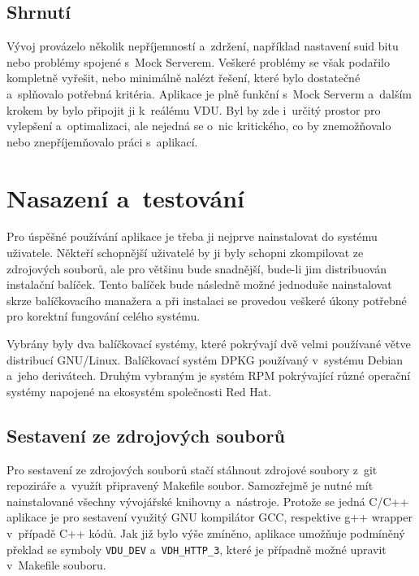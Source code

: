 \section{Shrnutí}
Vývoj provázelo několik nepříjemností a zdržení, například nastavení suid bitu nebo problémy spojené s Mock Serverem. Veškeré problémy se však podařilo kompletně vyřešit,
nebo minimálně nalézt řešení, které bylo dostatečné a splňovalo potřebná kritéria. Aplikace je plně funkční s Mock Serverm a dalším krokem by bylo připojit ji k reálému VDU.
Byl by zde i určitý prostor pro vylepšení a optimalizaci, ale nejedná se o nic kritického, co by znemožňovalo nebo znepříjemňovalo práci s aplikací.

\chapter{Nasazení a testování}

Pro úspěšné používání aplikace je třeba ji nejprve nainstalovat do systému uživatele. Někteří schopnější uživatelé by ji byly schopni zkompilovat ze zdrojových
souborů, ale pro většinu bude snadnější, bude-li jim distribuován instalační balíček. Tento balíček bude následně možné jednoduše nainstalovat skrze balíčkovacího manažera
a při instalaci se provedou veškeré úkony potřebné pro korektní fungování celého systému.

Vybrány byly dva balíčkovací systémy, které pokrývají dvě velmi používané větve distribucí \mbox{GNU/Linux}. Balíčkovací systém DPKG používaný v systému Debian a jeho derivátech.
Druhým vybraným je systém RPM pokrývající různé operační systémy napojené na ekosystém společnosti Red Hat.

\section{Sestavení ze zdrojových souborů}

Pro sestavení ze zdrojových souborů stačí stáhnout zdrojové soubory z git repoziráře a využít připravený Makefile soubor. Samozřejmě je nutné mít nainstalované
všechny vývojářské knihovny a nástroje. Protože se jedná C/C++ aplikace je pro sestavení využitý GNU kompilátor GCC, respektive g++ wrapper v případě C++ kódů.
Jak již bylo výše zmíněno, aplikace umožňuje podmíněný překlad se symboly \texttt{VDU\_DEV} a \texttt{VDH\_HTTP\_3}, které je případně možné upravit v Makefile souboru.

